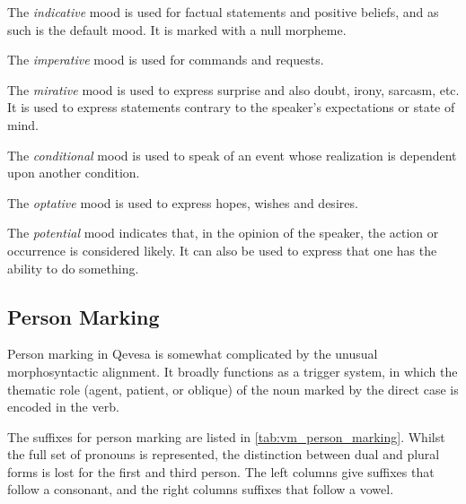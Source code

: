 \documentclass[grammar]{subfiles}
\begin{document}
The \emph{indicative} mood is used for factual statements and positive beliefs,
and as such is the default mood.  It is marked with a null morpheme. 

The \emph{imperative} mood is used for commands and requests. 

The \emph{mirative} mood is used to express surprise and also doubt, irony,
sarcasm, etc.  It is used to express statements contrary to the speaker’s
expectations or state of mind.

The \emph{conditional} mood is used to speak of an event whose realization is
dependent upon another condition. 

The \emph{optative} mood is used to express hopes, wishes and desires.

The \emph{potential} mood indicates that, in the opinion of the speaker, the
action or occurrence is considered likely.  It can also be used to express that
one has the ability to do something.

\subsection{Person Marking}
\label{ssec:vm_person_marking}

Person marking in Qevesa is somewhat complicated by the unusual morphosyntactic
alignment.  It broadly functions as a trigger system, in which the thematic
role (agent, patient, or oblique) of the noun marked by the direct case is
encoded in the verb.  


The suffixes for person marking are listed in \cref{tab:vm_person_marking}.
Whilst the full set of pronouns is represented, the distinction between dual
and plural forms is lost for the first and third person.  The left columns give
suffixes that follow a consonant, and the right columns suffixes that follow a
vowel. 
\end{document}
